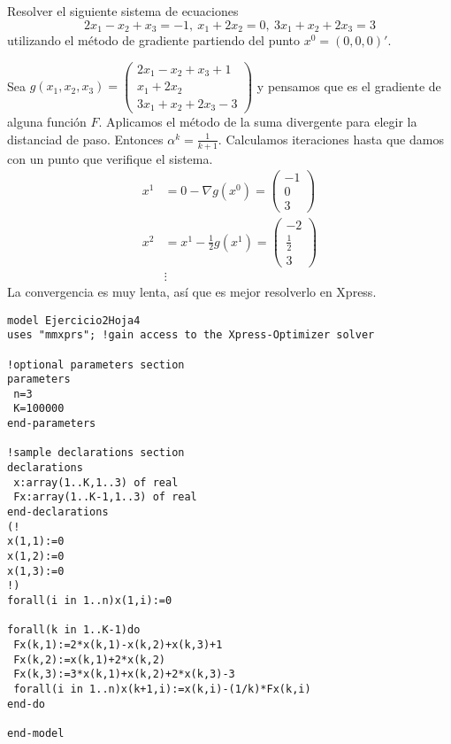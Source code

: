 \documentclass[twoside]{article}
\begin{document}
\newpage 
\begin{ejercicio}{2}%
Resolver el siguiente sistema de ecuaciones
\[
2x_1-x_2+x_3=-1,\ x_1+2x_2=0,\ 3x_1+x_2+2x_3=3
\]
utilizando el método de gradiente partiendo del punto $x^0=(0,0,0)'$.
\begin{solucion}
Sea $g(x_1,x_2,x_3)=\begin{pmatrix}
2x_1-x_2+x_3+1\\
 x_1+2x_2\\
 3x_1+x_2+2x_3-3
\end{pmatrix}$ y pensamos que es el gradiente de alguna función $F$. Aplicamos el método de la suma divergente para elegir la distanciad de paso. Entonces $\alpha^k=\frac{1}{k+1}$. Calculamos iteraciones hasta que damos con un punto que verifique el sistema.
\begin{align*}
x^1&=0-\nabla g(x^0)=\begin{pmatrix}
-1\\
0\\
3
\end{pmatrix}\\
x^2&=x^1-\frac{1}{2}g(x^1)=\begin{pmatrix}
-2\\
\frac{1}{2}\\
3
\end{pmatrix}\\
&\vdots
\end{align*}
La convergencia es muy lenta, así que es mejor resolverlo en Xpress.
\begin{verbatim}
model Ejercicio2Hoja4
uses "mmxprs"; !gain access to the Xpress-Optimizer solver

!optional parameters section
parameters
 n=3
 K=100000
end-parameters

!sample declarations section
declarations
 x:array(1..K,1..3) of real
 Fx:array(1..K-1,1..3) of real
end-declarations
(!
x(1,1):=0
x(1,2):=0
x(1,3):=0
!)
forall(i in 1..n)x(1,i):=0

forall(k in 1..K-1)do
 Fx(k,1):=2*x(k,1)-x(k,2)+x(k,3)+1
 Fx(k,2):=x(k,1)+2*x(k,2)
 Fx(k,3):=3*x(k,1)+x(k,2)+2*x(k,3)-3
 forall(i in 1..n)x(k+1,i):=x(k,i)-(1/k)*Fx(k,i)
end-do

end-model
\end{verbatim}
\end{solucion}

\end{ejercicio}

\newpage 
\end{document}
